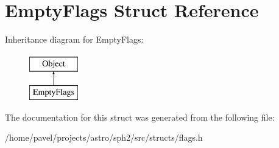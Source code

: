 \hypertarget{structEmptyFlags}{}\section{Empty\+Flags Struct Reference}
\label{structEmptyFlags}
Inheritance diagram for Empty\+Flags\+:\begin{figure}[H]
\begin{center}
\leavevmode
\includegraphics[height=2.000000cm]{structEmptyFlags}
\end{center}
\end{figure}


The documentation for this struct was generated from the following file\+:\begin{DoxyCompactItemize}
\item 
/home/pavel/projects/astro/sph2/src/structs/flags.\+h\end{DoxyCompactItemize}
